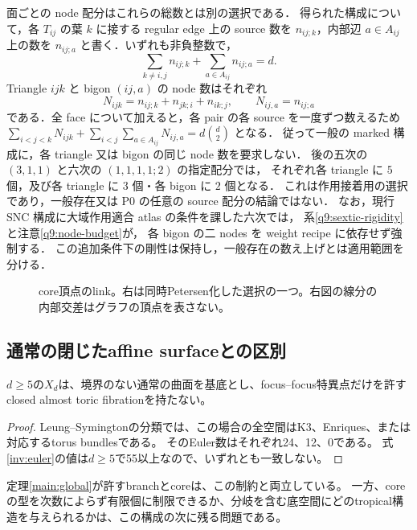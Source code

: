 面ごとの node 配分はこれらの総数とは別の選択である．
得られた構成について，各 $T_{ij}$ の葉 $k$ に接する regular edge 上の source 数を
$n_{ij;k}$，内部辺 $a\in A_{ij}$ 上の数を $n_{ij;a}$ と書く．いずれも非負整数で，
\[
 \sum_{k\ne i,j}n_{ij;k}+\sum_{a\in A_{ij}}n_{ij;a}=d.
\]
Triangle $ijk$ と bigon $(ij,a)$ の node 数はそれぞれ
\[
 N_{ijk}=n_{ij;k}+n_{jk;i}+n_{ik;j},\qquad N_{ij,a}=n_{ij;a}
\]
である．全 face について加えると，各 pair の各 source を一度ずつ数えるため
$\sum_{i<j<k}N_{ijk}+\sum_{i<j}\sum_{a\in A_{ij}}N_{ij,a}=d\binom d2$ となる．
従って一般の marked 構成に，各 triangle 又は bigon の同じ node 数を要求しない．
後の五次の $(3,1,1)$ と六次の $(1,1,1,1;2)$ の指定配分では，
それぞれ各 triangle に $5$ 個，及び各 triangle に $3$ 個・各 bigon に $2$ 個となる．
これは作用接着用の選択であり，一般存在又は P0 の任意の source 配分の結論ではない．
なお，現行 SNC 構成に大域作用適合 atlas の条件を課した六次では，
系\ref{q9:sextic-rigidity}と注意\ref{q9:node-budget}が，
各 bigon の二 nodes を weight recipe に依存せず強制する．
この追加条件下の剛性は保持し，一般存在の数え上げとは適用範囲を分ける．

\begin{figure}[ht]
\centering
{}
\caption{core頂点のlink。右は同時Petersen化した選択の一つ。右図の線分の内部交差はグラフの頂点を表さない。}
\label{fig:links}
\end{figure}

\subsection{通常の閉じたaffine surfaceとの区別}
\begin{corollary}\label{inv:no-almost-toric}
$d\ge5$の$X_d$は、境界のない通常の曲面を基底とし、focus--focus特異点だけを許すclosed almost toric fibrationを持たない。
\end{corollary}
\begin{proof}
Leung--Symingtonの分類\cite[Theorem 2.1, Table 1]{LeungSymington}では、この場合の全空間はK3、Enriques、または対応するtorus bundlesである。
そのEuler数はそれぞれ24、12、0である。
式\eqref{inv:euler}の値は$d\ge5$で55以上なので、いずれとも一致しない。
\end{proof}

定理\ref{main:global}が許すbranchとcoreは、この制約と両立している。
一方、coreの型を次数によらず有限個に制限できるか、分岐を含む底空間にどのtropical構造を与えられるかは、この構成の次に残る問題である。
